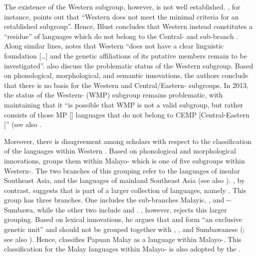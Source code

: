 The existence of the Western  subgroup, however, is not well established. \citet[68]{Blust.1999}, for instance, points out that  ``Western  does not meet the minimal criteria for an established subgroup''. Hence, {Blust} concludes that Western  instead constitutes a  ``residue'' of languages which do not belong to the Central- and  sub-branch \citep[68]{Blust.1999}. Along similar lines, \citet[14]{Adelaar.2005c} notes that Western   ``does not have a clear linguistic foundation [\ldots] and the genetic affiliations of its putative members remain to be investigated''. \citet{Donohue.2008} also discuss the problematic status of the Western  subgroup. Based on phonological, morphological, and semantic innovations, the authors conclude that there is no basis for the Western  and Central/Eastern- subgroups. In 2013, the status of the Western- (WMP) subgroup remains problematic, with \citet[31]{Blust.2013} maintaining that it  ``is possible that WMP is not a valid subgroup, but rather consists of those MP [] languages that do not belong to CEMP [Central-Eastern ]'' (see also \citealt[741–742]{Blust.2013}.



Moreover, there is disagreement among scholars with respect to the classification of the  languages within Western . Based on phonological and morphological innovations, \citet[31ff]{Blust.1994} groups them within Malayo- which is one of five subgroups within Western-. The two branches of this grouping refer to the  languages of insular Southeast Asia, and the  languages of mainland Southeast Asia (see also \citealt[32]{Blust.2013}). \citet{Adelaar.2005d}, by contrast, suggests that  is part of a larger collection of languages, namely . This group has three branches. One includes the sub-branches Malay\-ic, , and --Sumbawa, while the other two include  and . \citet{Blust.2010}, however, rejects this larger  grouping. Based on lexical innovations, he argues that  and  form  ``an exclusive genetic unit'' and should not be grouped together with , , and Sumbawanese (\citealt[80–81]{Blust.2010}; see also \citealt[736]{Blust.2013}). Hence, \citep[xxxii]{Blust.2013} classifies Papuan Malay as a  language within Malayo-. This classification for the Malay languages within Malayo- is also adopted by the  {\citep{Lewis.2016}}.

